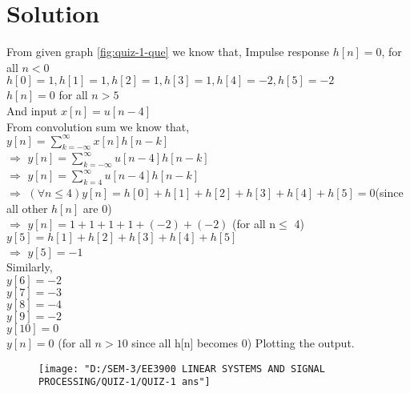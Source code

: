 \documentclass[journal,12pt,twocolumn]{IEEEtran}
\begin{document}
\section{Solution}
From given graph \eqref{fig:quiz-1-que} we know that,
Impulse response
$h[n]=0$, for all $n<0$ \label{eq2.24.1}\\
$h[0]=1, h[1]=1, h[2]=1, h[3]=1, h[4]=-2, h[5]=-2$ \label{eq2.24.2}\\
$h[n]=0$ for all $n>5$ \label{eq2.24.3}\\
And input $x[n] = u[n-4]$\\
From convolution sum we know that,\\
$y[n] = \sum_{k=-\infty }^{\infty} x[n]h[n-k]$\\
$\Rightarrow$ $y[n] = \sum_{k=-\infty }^{\infty} u[n-4]h[n-k]$\\
$\Rightarrow$ $y[n] = \sum_{k=4 }^{\infty} u[n-4]h[n-k]$\\
$\Rightarrow$ $(\forall n\leq 4) y[n]=h[0]+h[1]+h[2]+h[3]+h[4]+h[5]=0$(since all other $h[n]$ are $0$)\\
$\Rightarrow$ $y[n]=1+1+1+1+(-2)+(-2)$ (for all n$\leq$ 4)\\
$y[5]=h[1]+h[2]+h[3]+h[4]+h[5]$\\
$\Rightarrow$ $y[5]=-1$\\
Similarly,\\
$y[6]=-2$\\
$y[7]=-3$\\
$y[8]=-4$\\
$y[9]=-2$\\
$y[10]=0$\\
$y[n]=0$ (for all $n>10$ since all h[n] becomes $0$)
Plotting the output.\\
\begin{figure}[h]
	\centering
	\texttt{[image: "D:/SEM-3/EE3900 LINEAR SYSTEMS AND SIGNAL PROCESSING/QUIZ-1/QUIZ-1 ans"]}
	\caption{}
	\label{fig:quiz-1-ans}
\end{figure}
\end{document}
